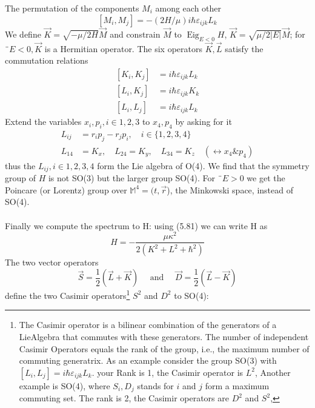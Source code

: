 The permutation of the components $M_i$ among each other
\begin{equation}
    \left[M_{i}, M_{j}\right]=-(2 H / \mu) i \hbar \varepsilon_{i j k} L_{k}
    \end{equation}
We define $\vec{K}=\sqrt{-\mu/2H}\vec{M}$ and constrain $\vec{M}$ to $\operatorname{Eig}_{E <0}H$, $\vec{K}=\sqrt{\mu/2|E|}\vec{M}$; for $¨E <0, \vec{K}$ is a Hermitian operator. The six operators {$\vec{K},\vec{L}$} satisfy the commutation relations
\begin{equation}
\begin{aligned}\left[K_{i}, K_{j}\right] &=i \hbar \varepsilon_{i j k} L_{k} \\\left[L_{i}, K_{j}\right] &=i \hbar \varepsilon_{i j k} K_{k} \\\left[L_{i}, L_{j}\right] &=i \hbar \varepsilon_{i j k} L_{k} \end{aligned}
\end{equation}
Extend the variables $x_i, p_i, i \in {1, 2, 3}$ to $x_4, p_4$ by asking for it
\begin{equation}
\begin{aligned} L_{i j} &=r_{i} p_{j}-r_{j} p_{i}, \quad i \in\{1,2,3,4\} \\ L_{14} &=K_{x}, \quad L_{24}=K_{y}, \quad L_{34}=K_{z} \quad\left(\leftrightarrow x_{4} \& p_{4}\right) \end{aligned}
\end{equation}
thus the $L_{ij}, i \in {1, 2, 3, 4}$ form the Lie algebra of O(4). We find that the symmetry group of $H$ is not SO(3) but the larger group SO(4). For $¨E> 0$ we get the Poincare (or Lorentz) group over $\mathbb{M}^4 = (t, \vec{r}$), the Minkowski space, instead of SO(4). 
\\\\
Finally we compute the spectrum to H: using (5.81) we can write H as
\begin{equation}
    H=-\frac{\mu \kappa^{2}}{2\left(K^{2}+L^{2}+\hbar^{2}\right)}
    \end{equation}
The two vector operators
\begin{equation}
    \vec{S}=\frac{1}{2}(\vec{L}+\vec{K}) \quad \text { and } \quad \vec{D}=\frac{1}{2}(\vec{L}-\vec{K})
    \end{equation}
define the two Casimir operators\footnote{The Casimir operator is a bilinear combination of the generators of a LieAlgebra that commutes with these generators. The number of independent Casimir Operators equals the rank of the group, i.e., the maximum number of commuting generatrix. As an example consider the group SO(3) with $[L_i, L_j] = i\hbar \varepsilon_{ijk}L_k$. your Rank is 1, the Casimir operator is $L^2$, Another example is SO(4), where ${S_i, D_j}$ stands for $i$ and $j$ form a maximum commuting set. The rank is 2, the Casimir operators are $D^2$ and $S^2$,} $S^2$ and $D^2$ to SO(4):
